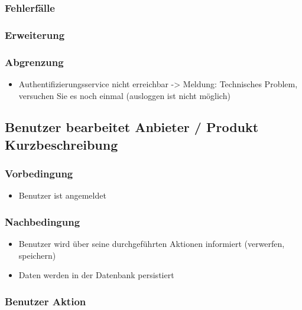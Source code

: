 \documentclass[a4paper,12pt]{article}
\begin{document}
\subsubsection{Fehlerfälle}\label{fehlerfalle-1}

\subsubsection{Erweiterung}\label{erweiterung}

\subsubsection{Abgrenzung}\label{abgrenzung}

\begin{itemize}
\item
  Authentifizierungsservice nicht erreichbar -\textgreater{} Meldung:
  Technisches Problem, versuchen Sie es noch einmal (ausloggen ist nicht
  möglich)
\end{itemize}

\subsection{Benutzer bearbeitet Anbieter / Produkt Kurzbeschreibung}
\subsubsection{Vorbedingung}

\begin{itemize}
\item
  Benutzer ist angemeldet
\end{itemize}

\subsubsection{Nachbedingung}\label{nachbedingung-2}

\begin{itemize}
\item
  Benutzer wird über seine durchgeführten Aktionen informiert
  (verwerfen, speichern)
\item
  Daten werden in der Datenbank persistiert
\end{itemize}

\subsubsection{Benutzer Aktion}\label{benutzer-aktion-2}
\end{document}
